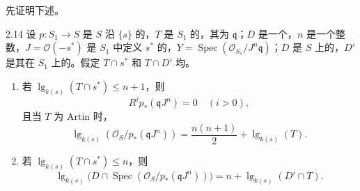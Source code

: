 先证明下述。
\begin{SGAresult}{}{2.14}
设 $p:S_1\to S$ 是 $S$ 沿 $\{s\}$ 的，$T$ 是 $S_1$ 的，其为 $\mathfrak q$；$D$ 是一个，$n$ 是一个整数，$J=\mathcal O(-s^*)$ 是 $S_1$ 中定义 $s^*$ 的，$Y=\operatorname{Spec}(\mathcal O_{S_1}/J^n\mathfrak q)$；$D$ 是 $S$ 上的，$D'$ 是其在 $S_1$ 上的。假定 $T\cap s^*$ 和 $T\cap D'$ 均。
\begin{enumerate}
\item[(i)] 若 $\operatorname{lg}_{k(s)}(T\cap s^*)\leq n+1$，则
\[
R^ip_*(\mathfrak qJ^n)=0\quad(i>0),
\]
且当 $T$ 为 Artin 时，
\[
\operatorname{lg}_{k(s)}(\mathcal O_S/p_*(\mathfrak qJ^n))
=\frac{n(n+1)}2+\operatorname{lg}_{k(s)}(T).
\]
\item[(ii)] 若 $\operatorname{lg}_{k(s)}(T\cap s^*)\leq n$，则
\[
\operatorname{lg}_{k(s)}\bigl(D\cap\operatorname{Spec}(\mathcal O_S/p_*(\mathfrak qJ^n))\bigr)
=n+\operatorname{lg}_{k(s)}(D'\cap T).
\]
\end{enumerate}
\end{SGAresult}
